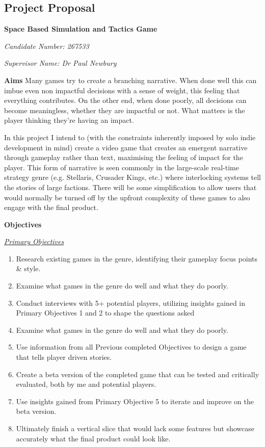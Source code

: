 \documentclass{report}
\begin{document}
\begin{appendices}
\chapter{Project Proposal}
\noindent\makebox[\linewidth]{\rule{\paperwidth}{0.4pt}}
\begin{center}
\textbf{Space Based Simulation and Tactics Game}
\end{center}

\textit{Candidate Number: 267533}

\textit{Supervisor Name: Dr Paul Newbury}

\textbf{Aims}
\newline
Many games try to create a branching narrative. When done well this can imbue even non impactful decisions with a sense of weight, this feeling that everything contributes. On the other end, when done poorly, all decisions can become meaningless, whether they are impactful or not. What matters is the player thinking they’re having an impact.

In this project I intend to (with the constraints inherently imposed by solo indie development in mind) create a video game that creates an emergent narrative through gameplay rather than text, maximising the feeling of impact for the player. This form of narrative is seen commonly in the large-scale real-time strategy genre (e.g. Stellaris, Crusader Kings, etc.) where interlocking systems tell the stories of large factions. There will be some simplification to allow users that would normally be turned off by the upfront complexity of these games to also engage with the final product.

\textbf{Objectives}

\underline{\textit{Primary Objectives}}

\begin{enumerate}
	\item Research existing games in the genre, identifying their gameplay focus points \& style.
	\item Examine what games in the genre do well and what they do poorly.
	\item Conduct interviews with 5+ potential players, utilizing insights gained in Primary Objectives 1 and 2 to shape the questions asked
	\item Examine what games in the genre do well and what they do poorly.
	\item Use information from all Previous completed Objectives to design a game that tells player driven stories.
	\item Create a beta version of the completed game that can be tested and critically evaluated, both by me and potential players.
	\item Use insights gained from Primary Objective 5 to iterate and improve on the beta version.
	\item Ultimately finish a vertical slice that would lack some features but showcase accurately what the final product could look like.
\end{enumerate}


\end{appendices}
\end{document}
